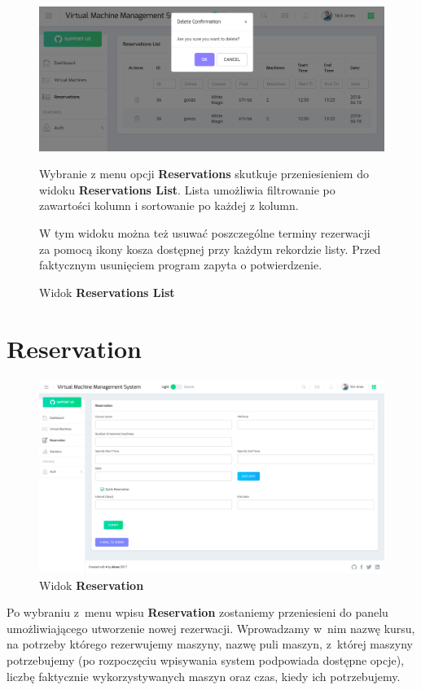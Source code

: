 \documentclass[a5paper, twoside, openany]{book}
\begin{document}
  \begin{figure}[H]
    \centerline{\includegraphics[width=0.9 \textwidth]{removing}}
    \caption{Widok \textbf{Reservations List}}

    Wybranie z menu opcji \textbf{Reservations} skutkuje przeniesieniem do widoku \textbf{Reservations List}. Lista umożliwia filtrowanie po zawartości kolumn i sortowanie po każdej z kolumn.

    W tym widoku można też usuwać poszczególne terminy rezerwacji za pomocą ikony kosza dostępnej przy każdym rekordzie listy. Przed faktycznym usunięciem program zapyta o potwierdzenie.
  \end{figure}

  \section{Reservation}

  \begin{figure}[H]
    \centerline{\includegraphics[width=0.9 \textwidth]{reservation}}
    \caption{Widok \textbf{Reservation}}
  \end{figure}

  Po wybraniu z~menu wpisu \textbf{Reservation} zostaniemy przeniesieni do panelu umożliwiającego utworzenie nowej rezerwacji. Wprowadzamy w~nim nazwę kursu, na potrzeby którego rezerwujemy maszyny, nazwę puli maszyn, z~której maszyny potrzebujemy (po rozpoczęciu wpisywania system podpowiada dostępne opcje), liczbę faktycznie wykorzystywanych maszyn oraz czas, kiedy ich potrzebujemy.
\end{document}

